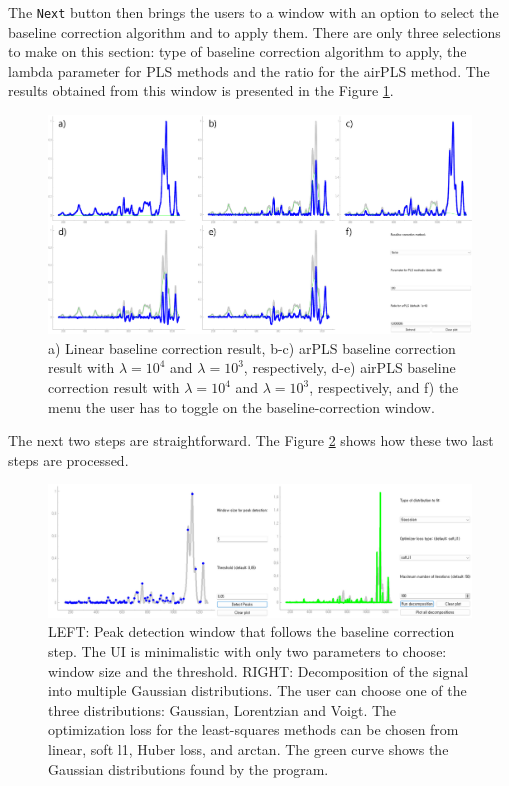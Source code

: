\documentclass{article}
\begin{document}
The \lstinline|Next| button then brings the users to a window with an option to select the baseline correction algorithm and to apply them.
There are only three selections to make on this section: type of baseline correction algorithm to apply, the lambda parameter for PLS methods and the ratio for the airPLS method.
The results obtained from this window is presented in the Figure \ref{fig:baseline_window}.
\begin{figure}
    \centering
    \includegraphics[width=\linewidth]{baseline_correction_window.png}
    \caption{a) Linear baseline correction result, b-c) arPLS baseline correction result with $\lambda=10^4$ and $\lambda=10^3$, respectively, d-e) airPLS baseline correction result with $\lambda=10^4$ and $\lambda=10^3$, respectively, and f) the menu the user has to toggle on the baseline-correction window.}
    \label{fig:baseline_window}
\end{figure}

The next two steps are straightforward. 
The Figure \ref{fig:last_two_windows} shows how these two last steps are processed.

\begin{figure}
    \centering
    \includegraphics[width=\linewidth]{last_two_windows.png}
    \caption{LEFT: Peak detection window that follows the baseline correction step. The UI is minimalistic with only two parameters to choose: window size and the threshold. RIGHT: Decomposition of the signal into multiple Gaussian distributions. The user can choose one of the three distributions: Gaussian, Lorentzian and Voigt. The optimization loss for the least-squares methods can be chosen from linear, soft l1, Huber loss, and arctan. The green curve shows the Gaussian distributions found by the program.}
    \label{fig:last_two_windows}
\end{figure}
\end{document}
